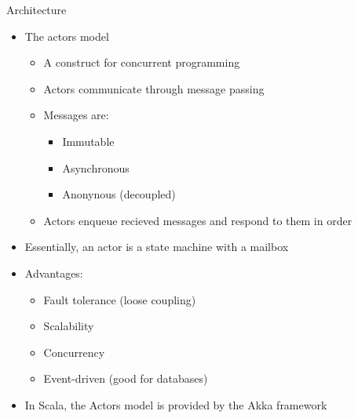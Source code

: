 \documentclass{beamer}
\begin{document}
\begin{frame}{Architecture}
  \begin{itemize}
    \item The \alert{actors} model~\citep{gupta2012akka,haller2012integration,agha1985actors}  \pause
    \begin{itemize}
      \item A construct for concurrent programming \pause
      \item Actors communicate through \alert{message passing} \pause
      \item Messages are: \pause
      \begin{itemize}
        \item Immutable  \pause
        \item Asynchronous \pause
        \item Anonynous (decoupled) \pause
      \end{itemize}
      \item Actors enqueue recieved messages and respond to them in order \pause
    \end{itemize}
    \item {Essentially, an actor is a \alert{state machine} with a \alert{mailbox}} \pause
    \item Advantages:  \pause
    \begin{itemize}
      \item Fault tolerance (loose coupling)  \pause
      \item Scalability  \pause
      \item Concurrency   \pause
      \item Event-driven (good for databases)  \pause
    \end{itemize}
    \item In Scala, the Actors model is provided by the \alert{Akka} framework
  \end{itemize}
\end{frame}
\end{document}

